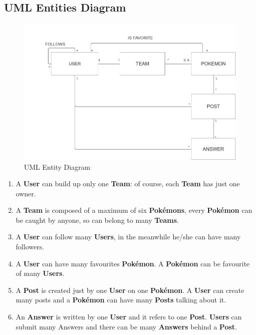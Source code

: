 \subsection{UML Entities Diagram}
\begin{figure}[H]
	\centering
	\includegraphics[width=\textwidth]{img/entity_diagram.png}
	\caption{UML Entity Diagram}
\end{figure}
\begin{enumerate}
	\item A \textbf{User} can build up only one \textbf{Team}: of course, each \textbf{Team} has just one owner.
	\item A \textbf{Team} is composed of a maximum of six \textbf{Pokémons}, every \textbf{Pokémon} can be caught by anyone, so can belong to many \textbf{Teams}.
	\item A \textbf{User} can follow many \textbf{Users}, in the meanwhile he/she can have many followers.
	\item A \textbf{User} can have many favourites \textbf{Pokémon}. A \textbf{Pokémon} can be favourite of many \textbf{Users}.
	\item A \textbf{Post} is created just by one \textbf{User} on one \textbf{Pokémon}. A \textbf{User} can create many posts and a \textbf{Pokémon} can have many \textbf{Posts} talking about it.
	\item An \textbf{Answer} is written by one \textbf{User} and it refers to one \textbf{Post}. \textbf{Users} can submit many Answers and there can be many \textbf{Answers} behind a \textbf{Post}.
\end{enumerate}

